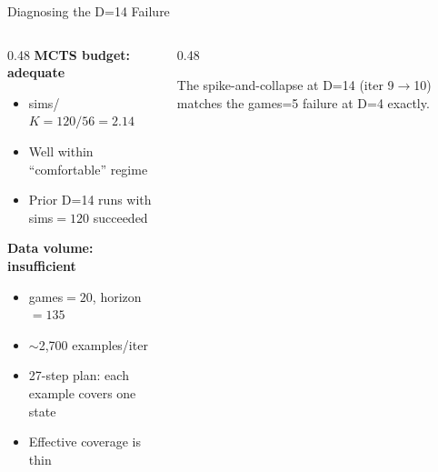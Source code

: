 \documentclass[aspectratio=169, 10pt]{beamer}
\begin{document}
\begin{frame}{Diagnosing the D=14 Failure}

\begin{columns}[T]
\begin{column}{0.48\textwidth}
\textbf{MCTS budget: adequate}
\begin{itemize}
  \item sims/$K = 120/56 = 2.14$
  \item Well within ``comfortable'' regime
  \item Prior D=14 runs with sims$=120$ succeeded
\end{itemize}

\vspace{0.3cm}
\textbf{Data volume: \alert{insufficient}}
\begin{itemize}
  \item games$=20$, horizon$=135$
  \item $\sim$2{,}700 examples/iter
  \item 27-step plan: each example covers one state
  \item Effective coverage is thin
\end{itemize}
\end{column}
\begin{column}{0.48\textwidth}
\vspace{0.2cm}
\begin{center}
\end{center}

\vspace{0.3cm}
{\small The spike-and-collapse at D=14 (iter 9$\to$10) matches the games=5 failure at D=4 exactly.}
\end{column}
\end{columns}
\end{frame}
\end{document}
